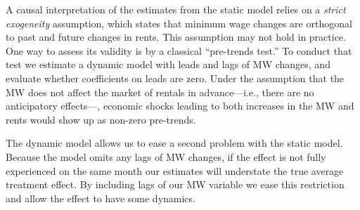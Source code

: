 A causal interpretation of the estimates from the static model relies on a \textit{strict 
exogeneity} assumption, which states that minimum wage changes are orthogonal to past and 
future changes in rents. This assumption may not hold in practice. One way to assess its 
validity is by a classical ``pre-trends test.'' To conduct that test we estimate a dynamic 
model with leads and lags of MW changes, and evaluate whether coefficients on leads are zero. 
Under the assumption that the MW does not affect the market of rentals in advance---i.e., there
are no anticipatory effects---, economic shocks leading to both increases in the MW and rents 
would show up as non-zero pre-trends. 

The dynamic model allows us to ease a second problem with the static model. Because the model
omits any lags of MW changes, if the effect is not fully experienced on the same month our 
estimates will understate the true average treatment effect. By including lags of our MW variable
we ease this restriction and allow the effect to have some dynamics.

